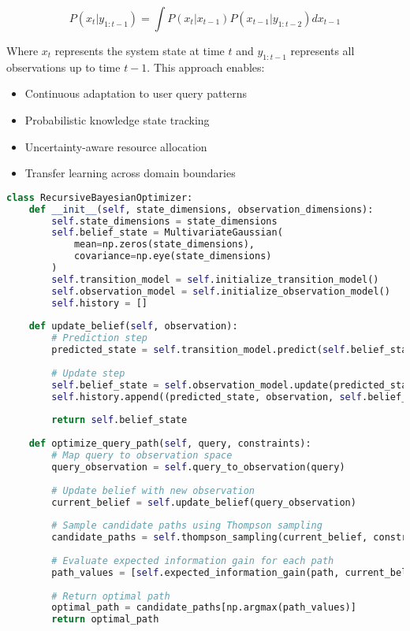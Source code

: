 \documentclass[journal,onecolumn]{IEEEtran}
\begin{document}
\begin{equation}
P(x_t|y_{1:t-1}) = \int P(x_t|x_{t-1})P(x_{t-1}|y_{1:t-2})dx_{t-1}
\end{equation}

Where $x_t$ represents the system state at time $t$ and $y_{1:t-1}$ represents all observations up to time $t-1$. This approach enables:

\begin{itemize}
\item Continuous adaptation to user query patterns
\item Probabilistic knowledge state tracking
\item Uncertainty-aware resource allocation
\item Transfer learning across domain boundaries
\end{itemize}

\begin{lstlisting}[language=Python, caption=RBON Implementation Pseudocode]
class RecursiveBayesianOptimizer:
    def __init__(self, state_dimensions, observation_dimensions):
        self.state_dimensions = state_dimensions
        self.belief_state = MultivariateGaussian(
            mean=np.zeros(state_dimensions),
            covariance=np.eye(state_dimensions)
        )
        self.transition_model = self.initialize_transition_model()
        self.observation_model = self.initialize_observation_model()
        self.history = []
        
    def update_belief(self, observation):
        # Prediction step
        predicted_state = self.transition_model.predict(self.belief_state)
        
        # Update step
        self.belief_state = self.observation_model.update(predicted_state, observation)
        self.history.append((predicted_state, observation, self.belief_state))
        
        return self.belief_state
        
    def optimize_query_path(self, query, constraints):
        # Map query to observation space
        query_observation = self.query_to_observation(query)
        
        # Update belief with new observation
        current_belief = self.update_belief(query_observation)
        
        # Sample candidate paths using Thompson sampling
        candidate_paths = self.thompson_sampling(current_belief, constraints, samples=100)
        
        # Evaluate expected information gain for each path
        path_values = [self.expected_information_gain(path, current_belief) for path in candidate_paths]
        
        # Return optimal path
        optimal_path = candidate_paths[np.argmax(path_values)]
        return optimal_path
\end{lstlisting}
\end{document}
